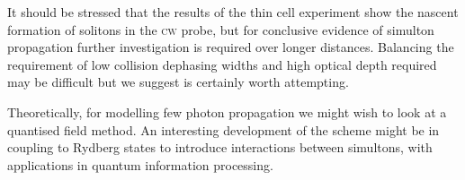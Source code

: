   It should be stressed that the results of the thin cell experiment show the
  nascent formation of solitons in the \textsc{cw} probe, but for conclusive
  evidence of simulton propagation further investigation is required over longer
  distances. Balancing the requirement of low collision dephasing widths and
  high optical depth required may be difficult but we suggest is certainly worth
  attempting.

  Theoretically, for modelling few photon propagation we might wish to look at a
  quantised field method. An interesting development of the scheme might be in
  coupling to Rydberg states to introduce interactions between simultons, with
  applications in quantum information processing.\cite{Maxwell2013,Saffman2010,Maghrebi2015}

